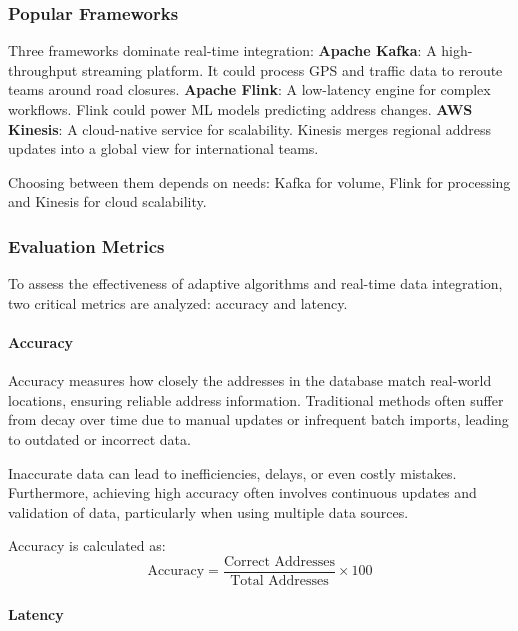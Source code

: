         \subsubsection{Popular Frameworks}

        Three frameworks dominate real-time integration: \blankLine
        \textbf{Apache Kafka}: A high-throughput streaming platform. It could process GPS and traffic data to reroute teams around road closures.\blankLine
        \textbf{Apache Flink}: A low-latency engine for complex workflows. Flink could power ML models predicting address changes.\blankLine
        \textbf{AWS Kinesis}: A cloud-native service for scalability. Kinesis merges regional address updates into a global view for international teams.\blankLine
        
        Choosing between them depends on needs: Kafka for volume, Flink for processing and Kinesis for cloud scalability. \autocite{Ranjbary2024Sep}


        \subsubsection{Evaluation Metrics}
        \label{sec:evaluation-metrics}

        To assess the effectiveness of adaptive algorithms and real-time data integration, two critical metrics are analyzed: accuracy and latency.

        \paragraph{Accuracy}
        \label{par:accuracy}

        Accuracy measures how closely the addresses in the database match real-world locations, ensuring reliable address information. Traditional methods often suffer from decay over time due to manual updates or infrequent batch imports, leading to outdated or incorrect data.  \blankLine

        Inaccurate data can lead to inefficiencies, delays, or even costly mistakes. Furthermore, achieving high accuracy often involves continuous updates and validation of data, particularly when using multiple data sources. \autocite{GeeksforGeeks2024Oct}\blankLine

        Accuracy is calculated as:
        \[
        \text{Accuracy} = \frac{\text{Correct Addresses}}{\text{Total Addresses}} \times 100
        \]
    

        \paragraph{Latency}
        \label{par:latency}


